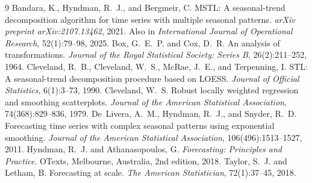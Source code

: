 \documentclass[10pt,twocolumn]{article}
\renewcommand\small{\fontsize{9}{10}\selectfont}
\begin{document}
\begingroup\small
\begin{thebibliography}{9}
Bandara, K., Hyndman, R.~J., and Bergmeir, C. MSTL: A seasonal-trend decomposition algorithm for time series with multiple seasonal patterns. \emph{arXiv preprint arXiv:2107.13462}, 2021. Also in \emph{International Journal of Operational Research}, 52(1):79--98, 2025.
Box, G.~E.~P. and Cox, D.~R. An analysis of transformations. \emph{Journal of the Royal Statistical Society: Series B}, 26(2):211--252, 1964.
Cleveland, R.~B., Cleveland, W.~S., McRae, J.~E., and Terpenning, I. STL: A seasonal-trend decomposition procedure based on LOESS. \emph{Journal of Official Statistics}, 6(1):3--73, 1990.
Cleveland, W.~S. Robust locally weighted regression and smoothing scatterplots. \emph{Journal of the American Statistical Association}, 74(368):829--836, 1979.
De~Livera, A.~M., Hyndman, R.~J., and Snyder, R.~D. Forecasting time series with complex seasonal patterns using exponential smoothing. \emph{Journal of the American Statistical Association}, 106(496):1513--1527, 2011.
Hyndman, R.~J. and Athanasopoulos, G. \emph{Forecasting: Principles and Practice}. OTexts, Melbourne, Australia, 2nd edition, 2018.
Taylor, S.~J. and Letham, B. Forecasting at scale. \emph{The American Statistician}, 72(1):37--45, 2018.
\end{thebibliography}
\endgroup
\end{document}
